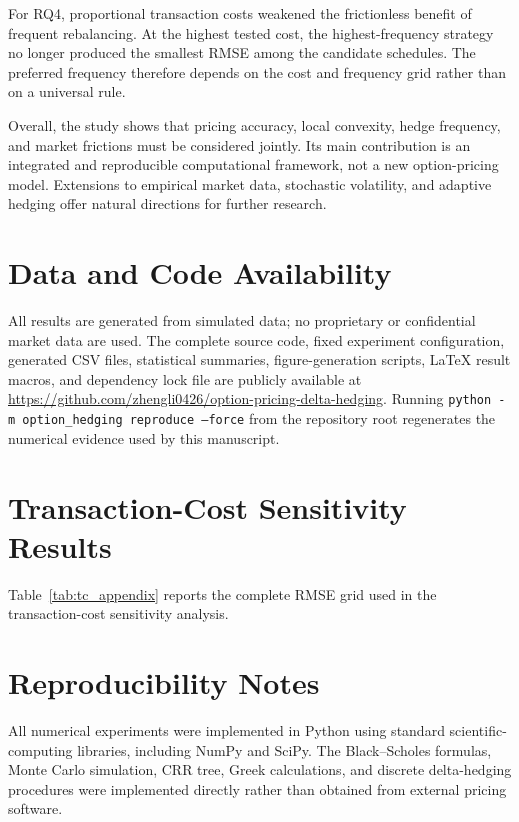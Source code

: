 \documentclass[11pt,a4paper]{article}
\begin{document}
For RQ4, proportional transaction costs weakened the frictionless benefit of frequent rebalancing. At the highest tested cost, the highest-frequency strategy no longer produced the smallest RMSE among the candidate schedules. The preferred frequency therefore depends on the cost and frequency grid rather than on a universal rule.

Overall, the study shows that pricing accuracy, local convexity, hedge frequency, and market frictions must be considered jointly. Its main contribution is an integrated and reproducible computational framework, not a new option-pricing model. Extensions to empirical market data, stochastic volatility, and adaptive hedging offer natural directions for further research.

\section*{Data and Code Availability}
All results are generated from simulated data; no proprietary or confidential market data are used. The complete source code, fixed experiment configuration, generated CSV files, statistical summaries, figure-generation scripts, LaTeX result macros, and dependency lock file are publicly available at \url{https://github.com/zhengli0426/option-pricing-delta-hedging}. Running \texttt{python -m option\_hedging reproduce --force} from the repository root regenerates the numerical evidence used by this manuscript.




\appendix

\section{Transaction-Cost Sensitivity Results}
\label{app:tc}

Table~\ref{tab:tc_appendix} reports the complete RMSE grid used in the transaction-cost sensitivity analysis.



\section{Reproducibility Notes}
\label{app:reproducibility}

All numerical experiments were implemented in Python using standard scientific-computing libraries, including NumPy and SciPy. The Black--Scholes formulas, Monte Carlo simulation, CRR tree, Greek calculations, and discrete delta-hedging procedures were implemented directly rather than obtained from external pricing software.
\end{document}
